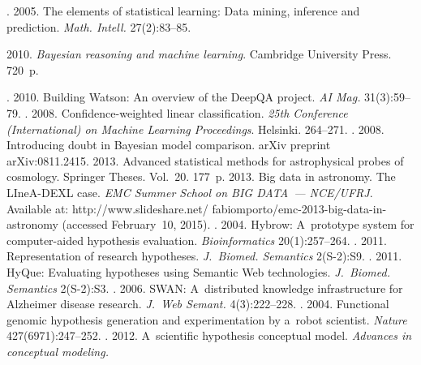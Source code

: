 \begin{multicols}{2}
{{\begin{thebibliography}{99}
. 2005. The elements
of statistical learning: Data mining, inference and prediction. \textit{Math.
Intell.} 27(2):83--85.

 2010. \textit{Bayesian reasoning and machine learning}.
Cambridge University Press. 720~p.


. 2010. Building Watson: An overview of the
DeepQA project. \textit{AI Mag.} 31(3):59--79.
. 2008. Confidence-weighted linear
classification. \textit{25th Conference (International) on Machine Learning
Proceedings}. Helsinki. 264--271.
. 2008. Introducing doubt
in Bayesian model comparison. arXiv preprint arXiv:0811.2415.
 2013. Advanced statistical methods for astrophysical probes of
cosmology. {Springer Theses}. Vol.~20. 177~p.
 2013. Big data in astronomy. The LIneA-DEXL case.
\textit{EMC Summer School on BIG DATA~--- NCE/UFRJ}.
Available at: {\sf
http://www.slideshare.net/ fabiomporto/emc-2013-big-data-in-astronomy} (accessed
February~10, 2015).
. 2004. Hybrow:
A~prototype system for computer-aided hypothesis evaluation.
\textit{Bioinformatics} 20(1):257--264.
. 2011. Representation of
research hypotheses. \textit{J.~Biomed. Semantics} 2(S-2):S9.
. 2011. HyQue: Evaluating
hypotheses using Semantic Web technologies. \textit{J.~Biomed. Semantics}
 2(S-2):S3.
.
2006. SWAN: A~distributed knowledge infrastructure for Alzheimer disease
research. \textit{J.~Web Semant.} 4(3):222--228.
. 2004. Functional genomic hypothesis
generation and experimentation by a~robot scientist. \textit{Nature}
427(6971):247--252.
. 2012. A~scientific hypothesis conceptual model.
\textit{Advances in conceptual modeling.}

\end{thebibliography}}}
\end{multicols}
